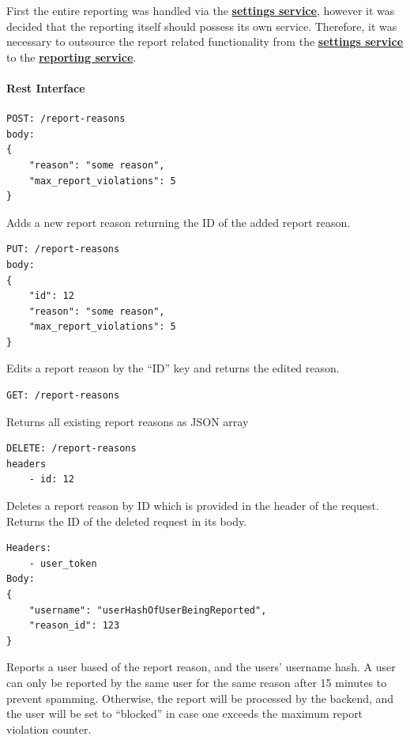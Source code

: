 First the entire reporting was handled via the \hyperref[subsubsec:settingsSer]{\textbf{settings service}}, however it
was decided that the reporting itself should possess its own service. %
Therefore, it was necessary to outsource the report related functionality from the
\hyperref[subsubsec:settingsSer]{\textbf{settings service}} to the
\hyperref[subsubsec:reportingSer]{\textbf{reporting service}}.

\paragraph{Rest Interface}
\begin{lstlisting}[label={lst:lstlisting7}]
POST: /report-reasons
body:
{
    "reason": "some reason",
    "max_report_violations": 5
}
\end{lstlisting}

Adds a new report reason returning the ID of the added report reason.

\begin{lstlisting}[label={lst:lstlisting8}]
PUT: /report-reasons
body:
{
    "id": 12
    "reason": "some reason",
    "max_report_violations": 5
}
\end{lstlisting}

Edits a report reason by the \enquote{ID} key and returns the edited reason.

\begin{lstlisting}[label={lst:lstlisting9}]
GET: /report-reasons
\end{lstlisting}

Returns all existing report reasons as JSON array

\begin{lstlisting}[label={lst:lstlisting10}]
DELETE: /report-reasons
headers
    - id: 12
\end{lstlisting}

Deletes a report reason by ID which is provided in the header of the request.
Returns the ID of the deleted request in its body.

\begin{lstlisting}[label={lst:lstlisting11}]
Headers:
    - user_token
Body:
{
    "username": "userHashOfUserBeingReported",
    "reason_id": 123
}
\end{lstlisting}

Reports a user based of the report reason, and the users' username hash.
A user can only be reported by the same user for the same reason after 15 minutes to prevent spamming.
Otherwise, the report will be processed by the backend, and the user will be set to \enquote{blocked} in case one
exceeds the maximum report violation counter.

